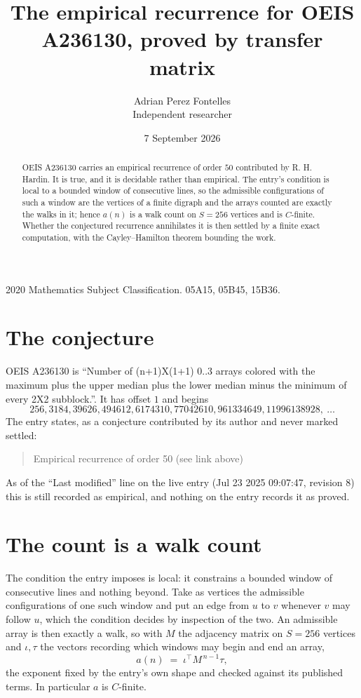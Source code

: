 \documentclass[11pt,a4paper]{article}
\title{The empirical recurrence for OEIS A236130, proved by transfer matrix}
\author{Adrian Perez Fontelles\\ \small Independent researcher}
\date{7 September 2026}
\theoremstyle{plain}
\theoremstyle{definition}
\begin{document}
\maketitle

\begin{abstract}
OEIS A236130 carries an empirical recurrence of order $50$ contributed by R. H. Hardin. It is
true, and it is decidable rather than empirical. The entry's condition is local to a bounded window of consecutive lines, so
the admissible configurations of such a window are the vertices of a finite digraph and the
arrays counted are exactly the walks in it; hence $a(n)$ is a walk count on $S=256$ vertices
and is $C$-finite. Whether the conjectured recurrence annihilates it is then settled by a
finite exact computation, with the Cayley--Hamilton theorem bounding the work.
\end{abstract}

\noindent\small 2020 Mathematics Subject Classification. 05A15, 05B45, 15B36.\normalsize

\section{The conjecture}

OEIS A236130 is ``Number of (n+1)X(1+1) 0..3 arrays colored with the maximum plus the upper median plus the lower median minus the minimum of every 2X2 subblock.''. It has offset $1$ and begins
\[
256, 3184, 39626, 494612, 6174310, 77042610, 961334649, 11996138928,\ \dots
\]
The entry states, as a conjecture contributed by its author and never marked settled:
\begin{quote}
Empirical recurrence of order 50 (see link above)
\end{quote}
As of the ``Last modified'' line on the live entry (Jul 23 2025 09:07:47, revision 8) this is still
recorded as empirical, and nothing on the entry records it as proved.

\section{The count is a walk count}

The condition the entry imposes is local: it constrains a bounded window of consecutive lines and nothing beyond. Take as
vertices the admissible configurations of one such window and put an edge from $u$ to $v$
whenever $v$ may follow $u$, which the condition decides by inspection of the two. An
admissible array is then exactly a walk, so with $M$ the adjacency matrix on $S=256$ vertices
and $\iota,\tau$ the vectors recording which windows may begin and end an array,
\[
a(n)\;=\;\iota^{\!\top}M^{\,n-1}\tau ,
\]
the exponent fixed by the entry's own shape and checked against its published terms. In
particular $a$ is $C$-finite.
\end{document}
